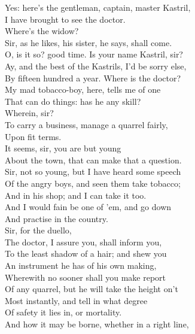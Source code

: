 \documentclass{memoir}
\begin{document}
\begin{drama*}
\druggerspeaks  Yes: here's the gentleman, captain, master Kastril,\\
 I have brought to see the doctor.\\
\facespeaks {} Where's the widow?\\
\druggerspeaks  Sir, as he likes, his sister, he says, shall come.\\
\facespeaks  O, is it so? good time. Is your name Kastril, sir?\\
\kastrilspeaks  Ay, and the best of the Kastrils, I'd be sorry else,\\
 By fifteen hundred a year. Where is the doctor?\\
 My mad tobacco-boy, here, tells me of one\\
 That can do things: has he any skill?\\
\facespeaks {} Wherein, sir?\\
\kastrilspeaks  To carry a business, manage a quarrel fairly,\\
 Upon fit terms.\\
\facespeaks {} It seems, sir, you are but young\\
 About the town, that can make that a question.\\
\kastrilspeaks  Sir, not so young, but I have heard some speech\\
 Of the angry boys, and seen them take tobacco;\\
 And in his shop; and I can take it too.\\
 And I would fain be one of 'em, and go down\\
 And practise in the country.\\
\facespeaks {} Sir, for the duello,\\
 The doctor, I assure you, shall inform you,\\
 To the least shadow of a hair; and shew you\\
 An instrument he has of his own making,\\
 Wherewith no sooner shall you make report\\
 Of any quarrel, but he will take the height on't\\
 Most instantly, and tell in what degree\\
 Of safety it lies in, or mortality.\\
 And how it may be borne, whether in a right line,\\

\end{drama*}
\end{document}
